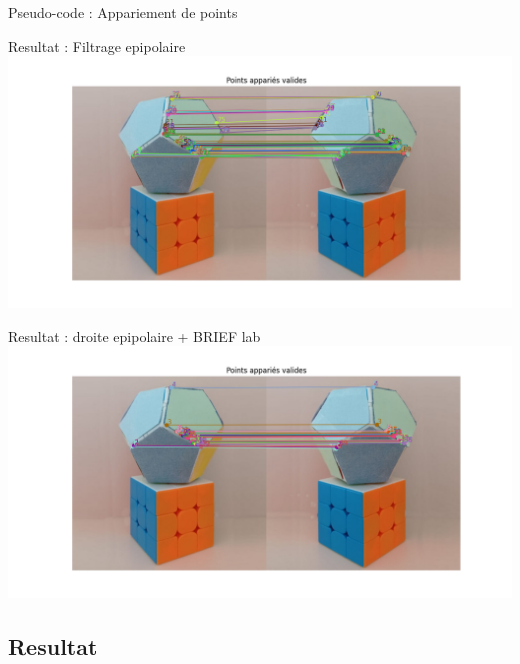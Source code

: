 \begin{frame}[fragile]{Pseudo-code : Appariement de points}
  
\end{frame}

\begin{frame}{Resultat : Filtrage epipolaire}
  \hspace*{-1cm}
  \includegraphics[width=1.1\linewidth]{capture/sans_brief.png}\\[0.5em]
\end{frame}

\begin{frame}{Resultat : droite epipolaire + BRIEF lab}
  \hspace*{-1cm}
  \includegraphics[width=1.1\linewidth]{capture/avec_brief.png}\\[0.5em]
\end{frame}

\subsection{Resultat}


